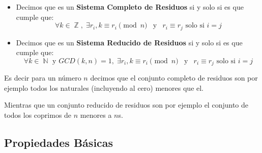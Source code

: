 \documentclass[12pt, fleqn]{report}                             %
\DeclareMathOperator \Space {\quad}                             %
\DeclareMathOperator \MiniSpace {\;}                            %
\newcommand \Also {\MiniSpace \text{y} \MiniSpace}              %
\DeclareMathOperator \Naturals  {\mathbb{N}}                     %
\DeclareMathOperator \Integers  {\mathbb{Z}}                     %
\begin{document}
            \begin{itemize}
                \item Decimos que es un \textbf{Sistema Completo de Residuos}
                    si y solo si es que cumple que:
                    \begin{equation*}
                        \forall k \in \Integers, \; \exists r_i, k \equiv r_i \pmod{n} 
                        \Also
                        r_i \equiv r_j \text{ solo si } i = j 
                    \end{equation*}

                \item Decimos que es un \textbf{Sistema Reducido de Residuos}
                    si y solo si es que cumple que:
                    \begin{equation*}
                        \forall k \in \Naturals \text{ y } GCD(k, n) = 1, \; 
                            \exists r_i, k \equiv r_i \pmod{n} 
                        \Also
                        r_i \equiv r_j \text{ solo si } i = j 
                    \end{equation*}
            \end{itemize}

            Es decir para un número $n$ decimos que el conjunto completo de residuos
            son por ejemplo todos los naturales (incluyendo al cero) menores que el.

            Mientras que un conjunto reducido de residuos son por ejemplo el conjunto
            de todos los coprimos de $n$ menores a $n$s.





        \clearpage
        \subsection{Propiedades Básicas}
\end{document}

